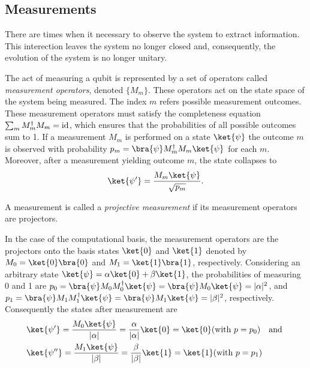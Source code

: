\subsection{Measurements} \label{subsec:Measurements}


There are times when it necessary to observe the system to extract information. This interection leaves the system no longer closed and, consequently, the evolution of the system is no longer unitary. 

\begin{definition}
The act of measuring a qubit is represented by a set of operators called \emph{measurement operators}, denoted $\{M_{m}\}$. These operators act on the state space  of the system being measured. The index $m$ refers possible measurement outcomes. These measurement operators must satisfy the completeness equation $\sum_{m} M_{m}^{\dagger}M_{m} = \mathrm{id}$, which ensures that the probabilities of all possible outcomes sum to 1. If a measurement ${M_m}$ is performed on a state $\ket{\psi}$ the outcome $m$ is observed with probability $p_m = \bra{\psi}M_{m}^{\dagger}M_{m}\ket{\psi}$ for each $m$. Moreover, after a measurement yielding outcome $m$, the state collapses to 
\begin{align*}
  \ket{\psi'}=\frac{M_{m}\ket{\psi}}{\sqrt{p_{m}}}.
\end{align*}
\end{definition}

\begin{definition}
  A measurement is called a \emph{projective measurement} if its measurement operators are projectors.
\end{definition}

\begin{example}
In the case of the computational basis, the measurement operators are the projectors onto the basis states $\ket{0}$ and $\ket{1}$ denoted by $M_{0} = \ket{0}\bra{0}$ and $M_{1} = \ket{1}\bra{1}$, respectively. Considering an arbitrary state $\ket{\psi} = \alpha \ket{0} + \beta \ket{1}$, the probabilities of measuring 0 and 1 are $p_0 = \bra{\psi} M_{0} M_{0}^{\dag}\ket{\psi}=\bra{\psi} M_{0} \ket{\psi} = |\alpha|^{2}$, and $p_1 = \bra{\psi} M_{1} M_{1}^{\dag}\ket{\psi} = \bra{\psi} M_{1} \ket{\psi} =  |\beta|^{2} $, respectively. Consequently the states after measurement are
\begin{align*}
  &\ket{\psi'}=\frac{M_{0}\ket{\psi}} {|\alpha|} = \frac{\alpha}{|\alpha|} \ket{0} = \ket{0} (\text{with  } p=p_0) \quad \text{and } \\
  &\ket{\psi''}= \frac{M_{1}\ket{\psi}} {|\beta|} = \frac{\beta}{|\beta|} \ket{1} = \ket{1} (\text{with  } p=p_1)
\end{align*}
\end{example}


